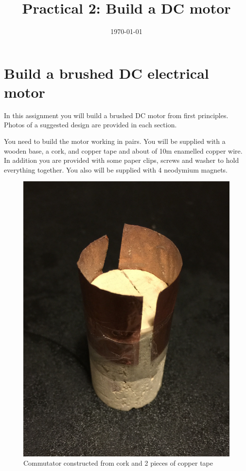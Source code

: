 \documentclass{instructions}
\title{Practical 2: Build a DC motor}
\date{\today}
\begin{document}
\maketitle





\part{Build a brushed DC electrical motor}

In this assignment you will build a brushed DC motor from first
principles. Photos of a suggested design are provided in each section.

You need to build the motor working in pairs. You will be supplied with
a wooden base, a cork, and copper tape and about of 10m enamelled copper
wire. In addition you are provided with some paper clips, screws and
washer to hold everything together. You also will be supplied with 4
neodymium magnets.



\begin{figure}
    \centering
    \includegraphics[width=0.5\linewidth]{dc-motor-000}
    \caption{Commutator constructed from cork and 2 pieces of copper tape}
    \label{fig1}
\end{figure}
\end{document}

